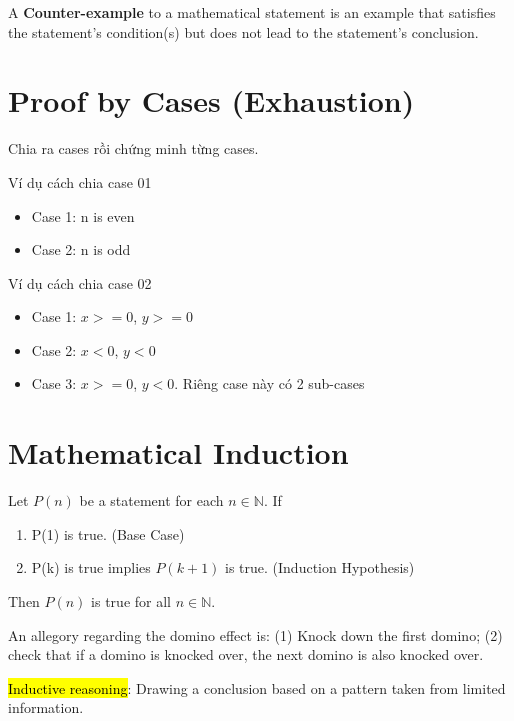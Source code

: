 A \textbf{Counter-example} to a mathematical statement is an example that satisfies the statement's condition(s) but does not lead to the statement's conclusion.

\section{Proof by Cases (Exhaustion)}

Chia ra cases rồi chứng minh từng cases.

Ví dụ cách chia case 01

\begin{itemize}
  \item Case 1: n is even
  \item Case 2: n is odd
\end{itemize}

Ví dụ cách chia case 02

\begin{itemize}
  \item Case 1: $x>=0$, $y>=0$
  \item Case 2: $x<0$, $y<0$
  \item Case 3: $x>=0$, $y<0$. Riêng case này có 2 sub-cases
\end{itemize}

\section{Mathematical Induction}

Let $P(n)$ be a statement for each $n \in \mathbb{N}$. If

\begin{enumerate}
  \item P(1) is true. (Base Case)
  \item P(k) is true implies $P(k+1)$ is true. (Induction Hypothesis)
\end{enumerate}

Then $P(n)$ is true for all $n \in \mathbb{N}$.

\vspace{.3cm}

An allegory regarding the domino effect is: (1) Knock down the first domino; (2) check that if a domino is knocked over, the next domino is also knocked over.

\vspace{0.5cm}

\hl{Inductive reasoning}: Drawing a conclusion based on a pattern taken from limited information.

